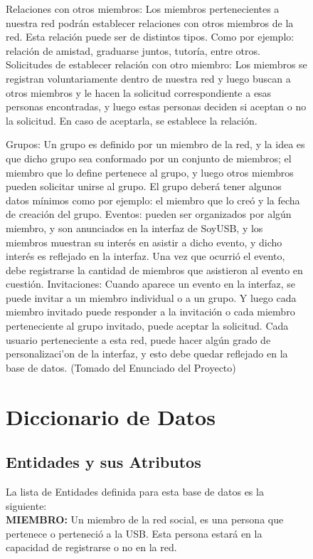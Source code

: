 \documentclass{article}
\begin{document}
\begin{figure}[h]
	Relaciones con otros miembros: Los miembros pertenecientes a nuestra red podr\'an establecer relaciones con otros miembros de la red. Esta relaci\'on puede ser de distintos tipos. Como por ejemplo: relaci\'on de amistad, graduarse juntos, tutor\'ia, entre otros.
	Solicitudes de establecer relaci\'on con otro miembro: Los miembros se registran voluntariamente dentro de nuestra red y luego buscan a otros miembros y le hacen la solicitud correspondiente a esas personas encontradas, y luego estas personas deciden si aceptan o no la solicitud. En caso de aceptarla, se establece la relaci\'on.\\
\newline

	Grupos: Un grupo es definido por un miembro de la red, y la idea es que dicho grupo sea conformado por un conjunto de miembros; el miembro que lo define pertenece al grupo, y luego otros miembros pueden solicitar unirse al grupo. El grupo deber\'a tener algunos datos m\'inimos como por ejemplo: el miembro que lo cre\'o y la fecha de creaci\'on del grupo.
	Eventos: pueden ser organizados por alg\'un miembro, y son anunciados en la interfaz de SoyUSB, y los miembros muestran su inter\'es en asistir a dicho evento, y dicho inter\'es es reflejado en la interfaz. Una vez que ocurri\'o el evento, debe registrarse la cantidad de miembros que asistieron al evento en cuesti\'on. 
	Invitaciones: Cuando aparece un evento en la interfaz, se puede invitar a un miembro individual o a un grupo. Y luego cada miembro invitado puede responder a la invitaci\'on o cada miembro perteneciente al grupo invitado, puede aceptar la solicitud.
	Cada usuario perteneciente a esta red, puede hacer alg\'un grado de personalizaci'on de la interfaz, y esto debe quedar reflejado en la base de datos. (Tomado del Enunciado del Proyecto)\\
\newline

\newpage
  
\section{Diccionario de Datos}
\subsection{Entidades y sus Atributos}
La lista de Entidades definida para esta base de datos es la siguiente:\\


\newline
{\bf{MIEMBRO:}}
	Un miembro de la red social, es una persona que pertenece o perteneci\'o a la USB. Esta persona estar\'a en la capacidad de registrarse o no en la red.\\
\newline


\end{figure}
\end{document}
